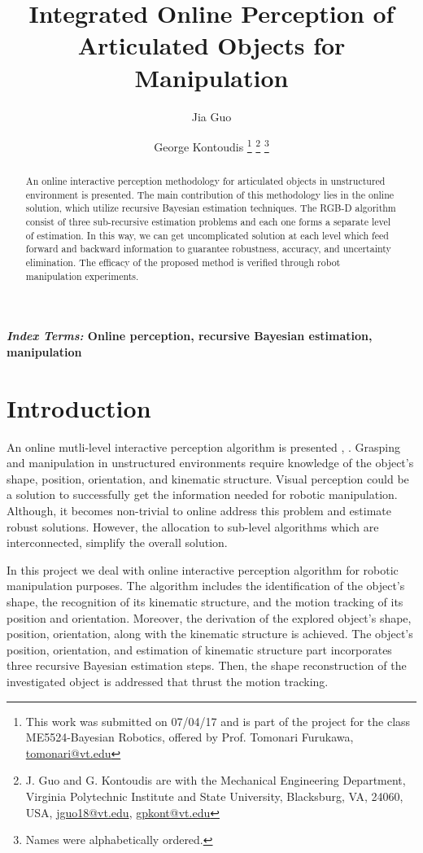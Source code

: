 \documentclass[letterpaper, 10 pt, conference]{ieeeconf}
\title{\LARGE \bf Integrated Online Perception of Articulated Objects for Manipulation}
\author{Jia Guo \and George Kontoudis
\thanks{This work was submitted on 07/04/17 and is part of the project for the class ME5524-Bayesian Robotics, offered by Prof. Tomonari Furukawa, \url{tomonari@vt.edu}}
\thanks{J. Guo and G. Kontoudis are with the Mechanical Engineering Department, Virginia Polytechnic Institute and State University, Blacksburg, VA, 24060, USA, \url{jguo18@vt.edu}, \url{gpkont@vt.edu}}%
\thanks{Names were alphabetically ordered.}%
}
\begin{document}
\maketitle
\thispagestyle{empty}
\pagestyle{empty}

\begin{abstract}
An online interactive perception methodology for articulated objects in unstructured environment is presented. The main contribution of this methodology lies in the online solution, which utilize recursive Bayesian estimation techniques. The RGB-D algorithm consist of three sub-recursive estimation problems and each one forms a separate level of estimation. In this way, we can get uncomplicated solution at each level which feed forward and backward information to guarantee robustness, accuracy, and uncertainty elimination. The efficacy of the proposed method is verified through robot manipulation experiments.     
\end{abstract}

\normalsize{\bf\small\emph{Index Terms:} Online perception, recursive Bayesian estimation, manipulation}  

\section{Introduction}\label{intro}
An online mutli-level interactive perception algorithm is presented \cite{martin2014online}, \cite{martin2016integrated}. Grasping and manipulation in unstructured environments require knowledge of the object's shape, position, orientation, and kinematic structure. Visual perception could be a solution to successfully get the information needed for robotic manipulation. Although, it becomes non-trivial to online address this problem and estimate robust solutions. However, the allocation to sub-level algorithms which are interconnected, simplify the overall solution.

In this project we deal with online interactive perception algorithm for robotic manipulation purposes. The algorithm includes the identification of the object's shape, the recognition of its kinematic structure, and the motion tracking of its position and orientation. Moreover, the derivation of the explored object's shape, position, orientation, along with the kinematic structure is achieved. The object's position, orientation, and estimation of kinematic structure part incorporates three recursive Bayesian estimation steps. Then, the shape reconstruction of the investigated object is addressed that thrust the motion tracking.
\end{document}
